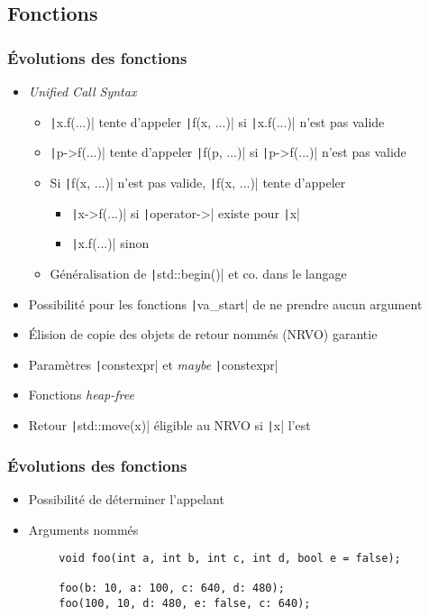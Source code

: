 \documentclass[C++.tex]{subfiles}
\begin{document}
\subsection*{Fonctions}
\begin{frame}[fragile]
	\frametitle{Évolutions des fonctions}
	\begin{itemize}
		\item \textit{Unified Call Syntax}
		\begin{itemize}
			\item \texttt|x.f(...)| tente d'appeler \texttt|f(x, ...)| si \texttt|x.f(...)| n'est pas valide
			\item \texttt|p->f(...)| tente d'appeler \texttt|f(p, ...)| si \texttt|p->f(...)| n'est pas valide
			\item Si \texttt|f(x, ...)| n'est pas valide, \texttt|f(x, ...)| tente d'appeler
			\begin{itemize}
				\item \texttt|x->f(...)| si \texttt|operator->| existe pour \texttt|x|
				\item \texttt|x.f(...)| sinon
			\end{itemize}
			\item Généralisation de \texttt|std::begin()| et co. dans le langage
		\end{itemize}
		\item Possibilité pour les fonctions \texttt|va_start| de ne prendre aucun argument
		\item Élision de copie des objets de retour nommés (NRVO) garantie


		\item Paramètres \texttt|constexpr| et \og{}\textit{maybe} \texttt|constexpr|\fg{}
		\item Fonctions \textit{heap-free}
		\item Retour \texttt|std::move(x)| éligible au NRVO si \texttt|x| l'est
	\end{itemize}
\end{frame}

\begin{frame}[fragile]
	\frametitle{Évolutions des fonctions}
	\begin{itemize}
		\item Possibilité de déterminer l'appelant
		\item Arguments nommés
	\end{itemize}
	
	\begin{verbatim}
		void foo(int a, int b, int c, int d, bool e = false);

		foo(b: 10, a: 100, c: 640, d: 480);
		foo(100, 10, d: 480, e: false, c: 640);
	\end{verbatim}
\end{frame}
\end{document}
